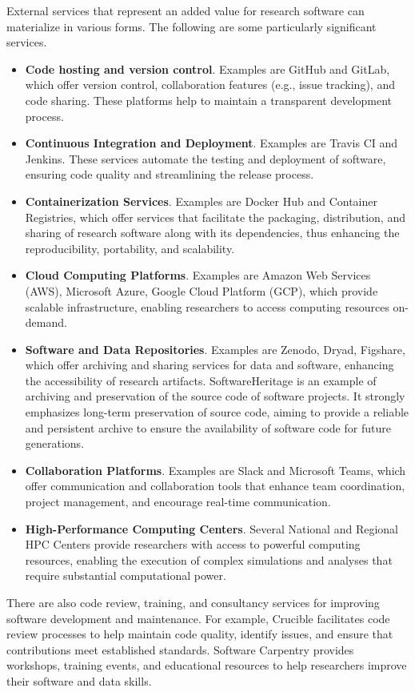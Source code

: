 External services that represent an added value for research software can materialize in various forms. The following are some particularly significant services.
\begin{itemize}
\item \textbf{Code hosting and version control}. Examples are GitHub and GitLab, which offer version control, collaboration features (e.g., issue tracking), and code sharing. These platforms help to maintain a transparent development process. 
\item \textbf{Continuous Integration and Deployment}. Examples are Travis CI and Jenkins. These services automate the testing and deployment of software, ensuring code quality and streamlining the release process. 
\item \textbf{Containerization Services}. Examples are Docker Hub and Container Registries, which offer services that facilitate the packaging, distribution, and sharing of research software along with its dependencies, thus enhancing the reproducibility, portability, and scalability. 
\item \textbf{Cloud Computing Platforms}. Examples are Amazon Web Services (AWS), Microsoft Azure, Google Cloud Platform (GCP), which provide scalable infrastructure, enabling researchers to access computing resources on-demand. 
\item \textbf{Software and Data Repositories}. Examples are Zenodo, Dryad, Figshare, which offer archiving and sharing services for data and software, enhancing the accessibility of research artifacts. SoftwareHeritage is an example of archiving and preservation of the source code of software projects. It strongly emphasizes long-term preservation of source code, aiming to provide a reliable and persistent archive to ensure the availability of software code for future generations.
\item \textbf{Collaboration Platforms}. Examples are Slack and Microsoft Teams, which offer communication and collaboration tools that enhance team coordination, project management, and encourage real-time communication.
\item \textbf{High-Performance Computing Centers}. Several National and Regional HPC Centers provide researchers with access to powerful computing resources, enabling the execution of complex simulations and analyses that require substantial computational power.
\end{itemize}

There are also code review, training, and consultancy services for improving software development and maintenance. For example, Crucible facilitates code review processes to help maintain code quality, identify issues, and ensure that contributions meet established standards. Software Carpentry provides workshops, training events, and educational resources to help researchers improve their software and data skills. 

